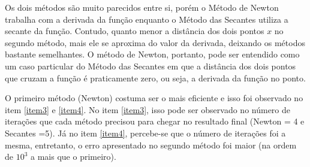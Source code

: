 \documentclass[a4paper]{article}
\begin{document}
Os dois métodos são muito parecidos entre si, porém o Método de Newton trabalha com a derivada da função enquanto o Método das Secantes utiliza a secante da função. Contudo, quanto menor a distância dos dois pontos $x$ no segundo método, mais ele se aproxima do valor da derivada, deixando os métodos bastante semelhantes. O método de Newton, portanto, pode ser entendido como um caso particular do Método das Secantes em que a distância dos dois pontos que cruzam a função é praticamente zero, ou seja, a derivada da função no ponto.

O primeiro método (Newton) costuma ser o mais eficiente e isso foi observado no item \ref{item3} e \ref{item4}. No item \ref{item3}, isso pode ser observado no número de iterações que cada método precisou para chegar no resultado final (Newton = 4 e Secantes =5). Já no item \ref{item4}, percebe-se que o número de iterações foi a mesma, entretanto, o erro apresentado no segundo método  foi maior (na ordem de $10^3$ a mais que o primeiro).
\end{document}
